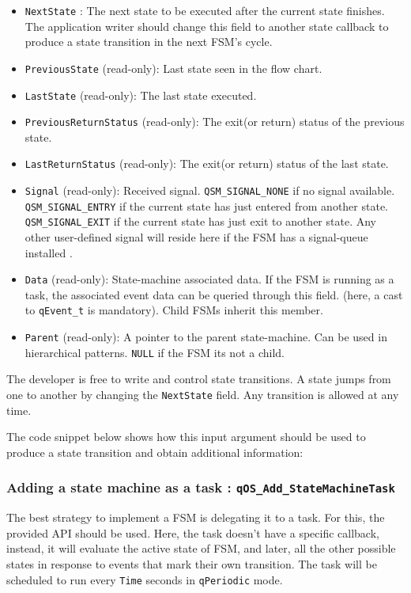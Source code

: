 \begin{itemize}
    \item \lstinline{NextState} : The next state to be executed after the current state finishes. The application writer should change this field to another state callback to produce a state transition in the next FSM's cycle.
    \item \lstinline{PreviousState} (read-only):  Last state seen in the flow chart.
    \item \lstinline{LastState} (read-only):  The last state executed.
    \item \lstinline{PreviousReturnStatus} (read-only): The exit(or return) status of the previous state.
    \item \lstinline{LastReturnStatus} (read-only): The exit(or return) status of the last state.
    \item \lstinline{Signal} (read-only): Received signal. \lstinline{QSM_SIGNAL_NONE} if no signal available. \lstinline{QSM_SIGNAL_ENTRY} if the current state has just entered from another state. \lstinline{QSM_SIGNAL_EXIT} if the current state has just exit to another state. Any other user-defined signal will reside here if the FSM has a signal-queue installed .
    \item \lstinline{Data} (read-only): State-machine associated data. If the FSM is running as a task, the associated event data can be queried through this field. (here, a cast to \lstinline{qEvent_t} is mandatory). Child FSMs inherit this member.
    \item \lstinline{Parent} (read-only): A pointer to the parent state-machine. Can be used in hierarchical  patterns. \lstinline{NULL} if the FSM its not a child.
\end{itemize}

The developer is free to write and control state transitions. A state jumps from one to another by changing the \lstinline{NextState} field. Any transition is allowed at any time.

The code snippet below shows how this input argument should be used to produce a state transition and obtain additional information: 
\medskip



\subsubsection{Adding a state machine as a task : \texorpdfstring{\lstinline{qOS_Add_StateMachineTask}}{qOS_Add_StateMachineTask} } \label{statemachinetask}
The best strategy to implement a FSM is delegating it to a task. For this, the provided  API should be used. Here, the task doesn't have a specific callback, instead, it will evaluate the active state of FSM, and later, all the other possible states in response to events that mark their own transition. The task will be scheduled to run every \lstinline{Time} seconds in \lstinline{qPeriodic} mode. 

